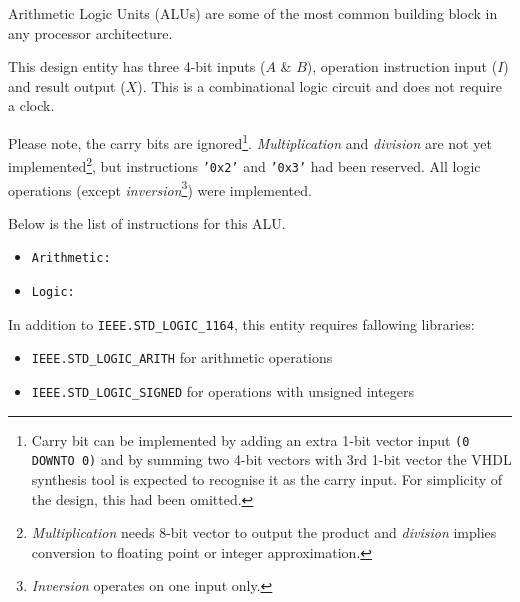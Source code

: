 \documentclass[10pt,a4paper]{report}
\begin{document}
 Arithmetic Logic Units (ALUs) are some of
 the most common building block in any
 processor architecture.

 This design entity has three 4-bit inputs
 ($A$ \& $B$), operation instruction input
 ($I$) and result output ($X$). This is a
 combinational logic circuit and does not
 require a clock.

 Please note, the carry bits are ignored\footnote{
 Carry bit can be implemented by adding an extra
 1-bit vector input \texttt{(0 DOWNTO 0)} and by
 summing two 4-bit vectors with 3rd 1-bit vector
 the VHDL synthesis tool is expected to recognise
 it as the carry input. For simplicity of the
 design, this had been omitted.}.
 \emph{Multiplication} and \emph{division} are not
 yet implemented\footnote{\emph{Multiplication} needs
 8-bit vector to output the product and \emph{division}
 implies conversion to floating point or integer
 approximation.}, but instructions \texttt{'0x2'} and
 \texttt{'0x3'} had been reserved. All logic operations
 (except \emph{inversion}\footnote{\emph{Inversion}
 operates on one input only.}) were implemented.

 Below is the list of instructions for this ALU.
 \begin{itemize}
 \item \texttt{Arithmetic:}
 \item \texttt{Logic:}
 \end{itemize}

 In addition to \texttt{IEEE.STD\_LOGIC\_1164},
 this entity  requires fallowing libraries:
 \begin{itemize}
 \item \texttt{IEEE.STD\_LOGIC\_ARITH}
 for arithmetic operations
 \item \texttt{IEEE.STD\_LOGIC\_SIGNED}
 for operations with unsigned integers
 \end{itemize}
\end{document}
